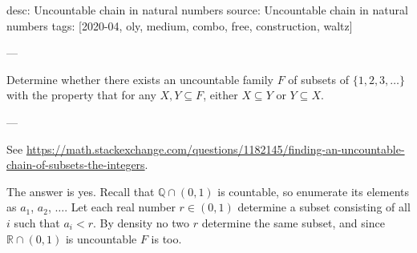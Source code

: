 desc: Uncountable chain in natural numbers
source: Uncountable chain in natural numbers
tags: [2020-04, oly, medium, combo, free, construction, waltz]

---

Determine whether there exists an uncountable family $F$ of subsets of $\{1,2,3,\ldots\}$ with the property that for any $X,Y\subseteq F$, either $X\subseteq Y$ or $Y\subseteq X$.

---

See \url{https://math.stackexchange.com/questions/1182145/finding-an-uncountable-chain-of-subsets-the-integers}.

The answer is yes. Recall that $\mathbb Q\cap(0,1)$ is countable, so enumerate its elements as $a_1$, $a_2$, $\ldots$. Let each real number $r\in(0,1)$ determine a subset consisting of all $i$ such that $a_i<r$. By density no two $r$ determine the same subset, and since $\mathbb R\cap(0,1)$ is uncountable $F$ is too.

